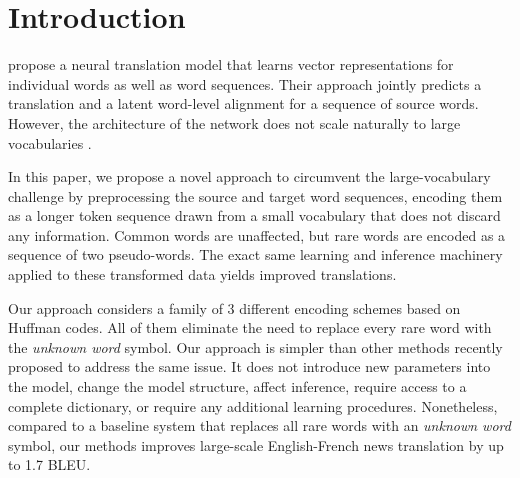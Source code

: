 \section{Introduction}
\label{sec:intro}

 propose a neural translation model
that learns vector representations for individual words as well as word
sequences. Their approach jointly predicts a translation and a latent
word-level alignment for a sequence of source words. However, the architecture
of the network does not scale naturally to large vocabularies
\cite{journals/corr/JeanCMB14}.

In this paper, we propose a novel approach to circumvent the large-vocabulary
challenge by preprocessing the source and target word sequences, encoding them
as a longer token sequence drawn from a small vocabulary that does not
discard any information. Common words are unaffected, but rare words are
encoded as a sequence of two pseudo-words. The exact same learning and
inference machinery applied to these transformed data yields improved
translations.

Our approach considers a family of 3 different encoding schemes based on
Huffman codes. All of them  eliminate the need to replace every rare word with
the \emph{unknown word} symbol. Our approach is simpler than other methods
recently proposed to address the same issue. It does not introduce new
parameters into the model, change the model structure, affect inference,
require access to a complete dictionary, or require any additional learning
procedures. Nonetheless, compared to a baseline system that replaces all rare
words with an \emph{unknown word} symbol, our methods improves large-scale
English-French news translation by up to 1.7 BLEU.
